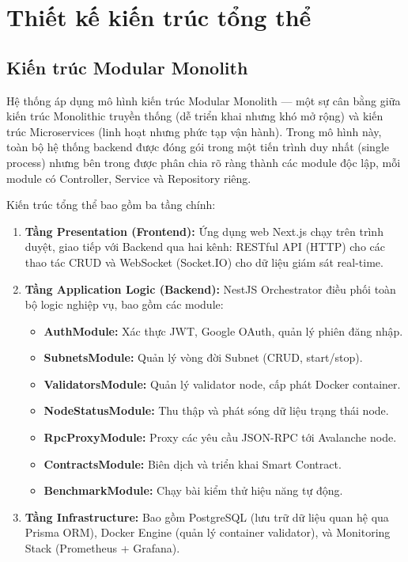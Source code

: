 \section{Thiết kế kiến trúc tổng thể}

\subsection{Kiến trúc Modular Monolith}

Hệ thống áp dụng mô hình kiến trúc Modular Monolith --- một sự cân bằng giữa kiến trúc Monolithic truyền thống (dễ triển khai nhưng khó mở rộng) và kiến trúc Microservices (linh hoạt nhưng phức tạp vận hành). Trong mô hình này, toàn bộ hệ thống backend được đóng gói trong một tiến trình duy nhất (single process) nhưng bên trong được phân chia rõ ràng thành các module độc lập, mỗi module có Controller, Service và Repository riêng.

Kiến trúc tổng thể bao gồm ba tầng chính:

\begin{enumerate}
    \item \textbf{Tầng Presentation (Frontend):} Ứng dụng web Next.js chạy trên trình duyệt, giao tiếp với Backend qua hai kênh: RESTful API (HTTP) cho các thao tác CRUD và WebSocket (Socket.IO) cho dữ liệu giám sát real-time.

    \item \textbf{Tầng Application Logic (Backend):} NestJS Orchestrator điều phối toàn bộ logic nghiệp vụ, bao gồm các module:
    \begin{itemize}
        \item \textbf{AuthModule:} Xác thực JWT, Google OAuth, quản lý phiên đăng nhập.
        \item \textbf{SubnetsModule:} Quản lý vòng đời Subnet (CRUD, start/stop).
        \item \textbf{ValidatorsModule:} Quản lý validator node, cấp phát Docker container.
        \item \textbf{NodeStatusModule:} Thu thập và phát sóng dữ liệu trạng thái node.
        \item \textbf{RpcProxyModule:} Proxy các yêu cầu JSON-RPC tới Avalanche node.
        \item \textbf{ContractsModule:} Biên dịch và triển khai Smart Contract.
        \item \textbf{BenchmarkModule:} Chạy bài kiểm thử hiệu năng tự động.
    \end{itemize}

    \item \textbf{Tầng Infrastructure:} Bao gồm PostgreSQL (lưu trữ dữ liệu quan hệ qua Prisma ORM), Docker Engine (quản lý container validator), và Monitoring Stack (Prometheus + Grafana).
\end{enumerate}

